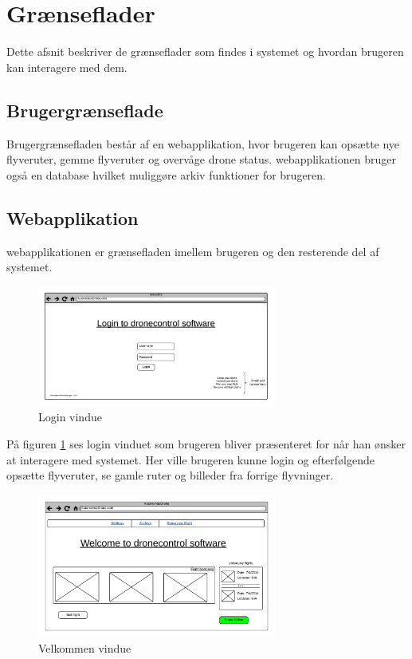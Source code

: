 \section{Grænseflader}
Dette afsnit beskriver de grænseflader som findes i systemet og hvordan brugeren kan interagere med dem.

\subsection{Brugergrænseflade}
Brugergrænsefladen består af en webapplikation, hvor brugeren kan opsætte nye flyveruter, gemme flyveruter og overvåge drone status. webapplikationen bruger også en database hvilket muliggøre arkiv funktioner for brugeren. 

\subsection{Webapplikation}
webapplikationen er grænsefladen imellem brugeren og den resterende del af systemet. 

\vspace{-5pt}
\begin{figure}[H]
	\centering
	\includegraphics[width=0.7\textwidth]{Billeder/UI_mockups/login.png}
	\vspace{-5pt}
	\caption{Login vindue}
	\label{fig:mockup_login}
\end{figure}

På figuren \ref{fig:mockup_login} ses login vinduet som brugeren bliver præsenteret for når han ønsker at interagere med systemet. Her ville brugeren kunne login og efterfølgende opsætte flyveruter, se gamle ruter og billeder fra forrige flyvninger. \newpage

\vspace{-5pt}
 \begin{figure}[H]
 	\centering
 	\includegraphics[width=0.7\textwidth]{Billeder/UI_mockups/index.png}
 	\vspace{-5pt}
 	\caption{Velkommen vindue}
 	\label{fig:mockup_welcome}
 \end{figure} 
 
